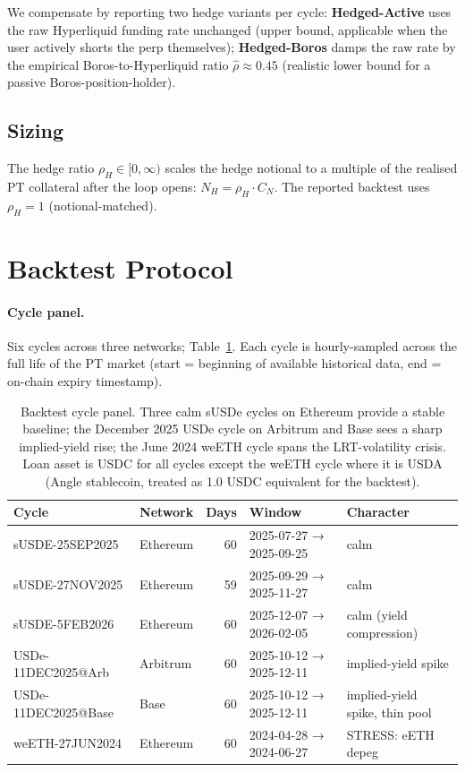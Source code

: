 \documentclass[11pt,a4paper]{article}
\begin{document}
We compensate by reporting two hedge variants per cycle:
\textbf{Hedged-Active} uses the raw Hyperliquid funding rate
unchanged (upper bound, applicable when the user actively shorts
the perp themselves); \textbf{Hedged-Boros} damps the raw rate by
the empirical Boros-to-Hyperliquid ratio
\(\hat{\rho} \approx 0.45\) (realistic lower bound for a passive
Boros-position-holder).

\subsection{Sizing}

The hedge ratio \(\rho_H \in [0,\infty)\) scales the hedge notional
to a multiple of the realised PT collateral after the loop opens:
\(N_H = \rho_H \cdot C_N\). The reported backtest uses
\(\rho_H = 1\) (notional-matched).

\section{Backtest Protocol}
\label{sec:protocol}

\paragraph{Cycle panel.} Six cycles across three networks;
Table~\ref{tab:cycles}. Each cycle is hourly-sampled across the
full life of the PT market (start = beginning of available
historical data, end = on-chain expiry timestamp).

\begin{table}[ht]
\centering
\footnotesize
\begin{tabular}{llrll}
\toprule
Cycle & Network & Days & Window & Character \\
\midrule
sUSDE-25SEP2025      & Ethereum & 60 & 2025-07-27 → 2025-09-25 & calm \\
sUSDE-27NOV2025      & Ethereum & 59 & 2025-09-29 → 2025-11-27 & calm \\
sUSDE-5FEB2026       & Ethereum & 60 & 2025-12-07 → 2026-02-05 & calm (yield compression) \\
USDe-11DEC2025@Arb   & Arbitrum & 60 & 2025-10-12 → 2025-12-11 & implied-yield spike \\
USDe-11DEC2025@Base  & Base     & 60 & 2025-10-12 → 2025-12-11 & implied-yield spike, thin pool \\
weETH-27JUN2024      & Ethereum & 60 & 2024-04-28 → 2024-06-27 & STRESS: eETH depeg \\
\bottomrule
\end{tabular}
\caption{Backtest cycle panel. Three calm sUSDe cycles on
Ethereum provide a stable baseline; the December 2025 USDe cycle
on Arbitrum and Base sees a sharp implied-yield rise; the June
2024 weETH cycle spans the LRT-volatility crisis. Loan asset
is USDC for all cycles except the weETH cycle where it is USDA
(Angle stablecoin, treated as 1.0 USDC equivalent for the
backtest).}
\label{tab:cycles}
\end{table}
\end{document}
